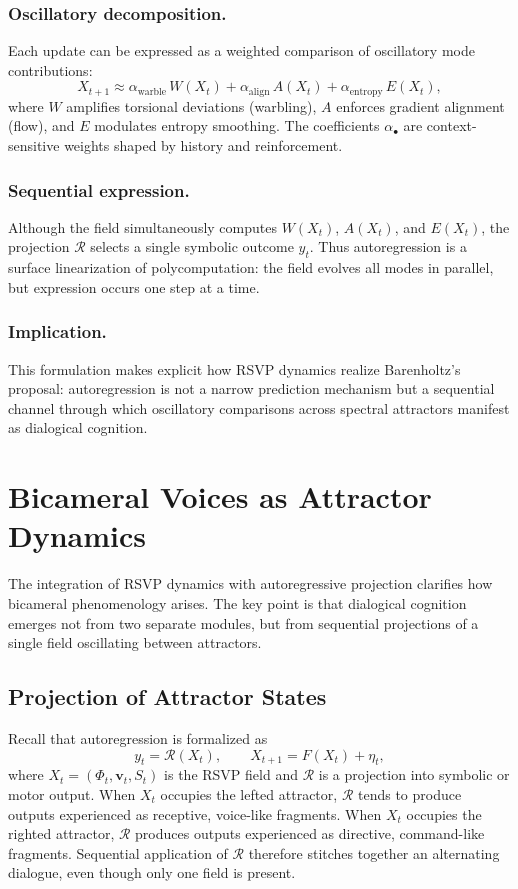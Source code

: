 \documentclass[a4paper,11pt]{article}
\begin{document}
\subsubsection{Oscillatory decomposition.}  
Each update can be expressed as a weighted comparison of oscillatory mode contributions:
\begin{equation}
X_{t+1} \approx 
\alpha_{\mathrm{warble}} \, W(X_t)
+ \alpha_{\mathrm{align}} \, A(X_t)
+ \alpha_{\mathrm{entropy}} \, E(X_t),
\end{equation}
where $W$ amplifies torsional deviations (warbling), $A$ enforces gradient alignment (flow), and $E$ modulates entropy smoothing. The coefficients $\alpha_\bullet$ are context-sensitive weights shaped by history and reinforcement.  

\subsubsection{Sequential expression.}  
Although the field simultaneously computes $W(X_t)$, $A(X_t)$, and $E(X_t)$, the projection $\mathcal{R}$ selects a single symbolic outcome $y_t$.  
Thus autoregression is a surface linearization of polycomputation: the field evolves all modes in parallel, but expression occurs one step at a time.  

\subsubsection{Implication.}  
This formulation makes explicit how RSVP dynamics realize Barenholtz’s proposal: autoregression is not a narrow prediction mechanism but a sequential channel through which oscillatory comparisons across spectral attractors manifest as dialogical cognition.

\section{Bicameral Voices as Attractor Dynamics}
\label{sec:bicameral-voices}

The integration of RSVP dynamics with autoregressive projection clarifies how
bicameral phenomenology arises. The key point is that dialogical cognition
emerges not from two separate modules, but from sequential projections of a
single field oscillating between attractors.

\subsection{Projection of Attractor States}
Recall that autoregression is formalized as
\begin{equation}
y_t = \mathcal{R}(X_t), \qquad 
X_{t+1} = F(X_t) + \eta_t,
\end{equation}
where $X_t=(\Phi_t,\mathbf{v}_t,S_t)$ is the RSVP field and $\mathcal{R}$ is a
projection into symbolic or motor output. When $X_t$ occupies the lefted
attractor, $\mathcal{R}$ tends to produce outputs experienced as receptive,
voice-like fragments. When $X_t$ occupies the righted attractor, $\mathcal{R}$
produces outputs experienced as directive, command-like fragments. Sequential
application of $\mathcal{R}$ therefore stitches together an alternating
dialogue, even though only one field is present.
\end{document}
